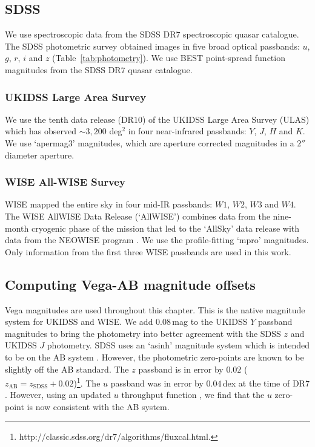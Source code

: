 \subsection{SDSS}

We use spectroscopic data from the SDSS DR$7$ spectroscopic quasar catalogue.
The SDSS photometric survey obtained images in five broad optical passbands: $u$, $g$, $r$, $i$ and $z$ (Table~\ref{tab:photometry}).  
We use BEST point-spread function magnitudes from the SDSS DR$7$ quasar catalogue.

\subsubsection{UKIDSS Large Area Survey}

We use the tenth data release (DR$10$) of the UKIDSS Large Area Survey (ULAS) which has observed $\sim 3,200$ deg$^2$ in four near-infrared passbands: $Y$, $J$, $H$ and $K$. 
We use `apermag$3$' magnitudes, which are aperture corrected magnitudes in a $2''$ diameter aperture.

\subsubsection{WISE All-WISE Survey}

WISE mapped the entire sky in four mid-IR passbands: $W1$, $W2$, $W3$ and $W4$. 
The WISE AllWISE Data Release (`AllWISE') combines data from the nine-month cryogenic phase of the mission that led to the `AllSky' data release with data from the NEOWISE program \citep{mainzer11}. 
We use the profile-fitting `mpro' magnitudes.   
Only information from the first three WISE passbands are used in this work.

\subsection{Computing Vega-AB magnitude offsets}

Vega magnitudes are used throughout this chapter. 
This is the native magnitude system for UKIDSS and WISE.
We add $0.08$\,mag to the UKIDSS $Y$ passband magnitudes to bring the photometry into better agreement with the SDSS $z$ and UKIDSS $J$ photometry. 
SDSS uses an `asinh' magnitude system \citep{lupton99} which is intended to be on the AB system \citep{oke83}.
However, the photometric zero-points are known to be slightly off the AB standard. 
The $z$ passband is in error by $0.02$ ($z_{\text{AB}} = z_{\text{SDSS}} + 0.02$)\footnote{http://classic.sdss.org/dr$7$/algorithms/fluxcal.html.}.
The $u$ passband was in error by $0.04$\,dex at the time of DR$7$. 
However, using an updated $u$ throughput function \citep{doi10}, we find that the $u$ zero-point is now consistent with the AB system. 

